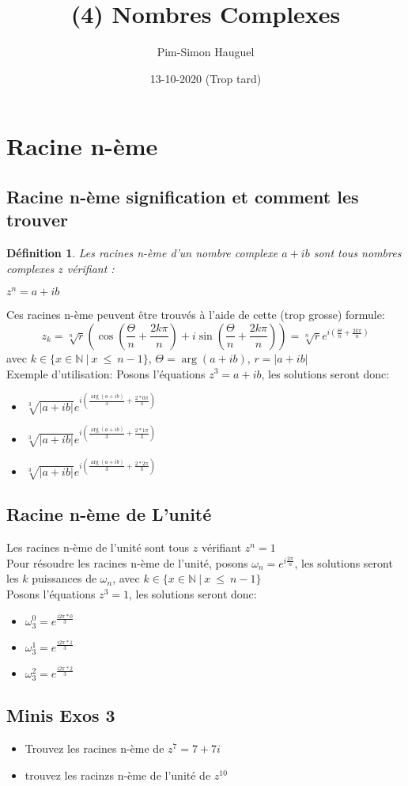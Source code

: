 \message{ !name(main.tex)}\documentclass{article}
\title{(4) Nombres Complexes}
\author{Pim-Simon Hauguel}
\date{13-10-2020 (Trop tard)}
\newtheorem{defi}{Définition}
\begin{document}
\section{Racine n-ème}

\subsection{Racine n-ème signification et comment les trouver}
\begin{defi}
  Les racines n-ème d'un nombre complexe $a + ib$ sont tous nombres complexes $z$ vérifiant :
  \begin{center}
    $z^{n} = a + ib$
  \end{center}
\end{defi}
Ces racines n-ème peuvent être trouvés à l'aide de cette (trop grosse) formule:
\[z_{k} = \sqrt[n]{r}(\cos(\frac{\Theta}{n} + \frac{2k\pi}{n}) + i\sin(\frac{\Theta}{n} + \frac{2k\pi}{n})) = \sqrt[n]{r}e^{i(\frac{\Theta}{n} + \frac{2k\pi}{n})}\] avec $k \in\{x \in\mathbb{N}~|~x~\leq~n-1\}$, $\Theta=\arg (a + ib)$, $r = |a + ib|$\\
Exemple d'utilisation:
Posons l'équations $z^{3} = a + ib$, les solutions seront donc:
\begin{itemize}
  \item $\sqrt[3]{|a + ib|}e^{i (\frac{\arg (a + ib)}{3} +\frac{2*0\pi}{3})}$
  \item $\sqrt[3]{|a + ib|}e^{i (\frac{\arg (a + ib)}{3} +\frac{2*1\pi}{3})}$
  \item $\sqrt[3]{|a + ib|}e^{i (\frac{\arg (a + ib)}{3} +\frac{2*2\pi}{3})}$
\end{itemize}

\subsection{Racine n-ème de L'unité}
Les racines n-ème de l'unité sont tous $z$ vérifiant $z^{n} = 1$\\
Pour résoudre les racines n-ème de l'unité, posons $\omega_{n} = e^{i\frac{2\pi}{n}}$, les solutions seront les $k$ puissances de $\omega_{n}$, avec $k \in \{x \in\mathbb{N}~|~x~\leq~n-1\}$\\
Posons l'équations $z^{3} = 1$, les solutions seront donc:
\begin{itemize}
  \item $\omega_{3}^{0}=e^{\frac{i2\pi*0}{3}}$
  \item $\omega_{3}^{1}=e^{\frac{i2\pi*1}{3}} $
  \item $\omega_{3}^{2}=e^{\frac{i2\pi*2}{3}}$
\end{itemize}

\subsection{Minis Exos 3}
\begin{itemize}
  \item Trouvez les racines n-ème de $z^{7} = 7 + 7i$
  \item trouvez les racinzs n-ème de l'unité de $z^{10}$
\end{itemize}


\end{document}
